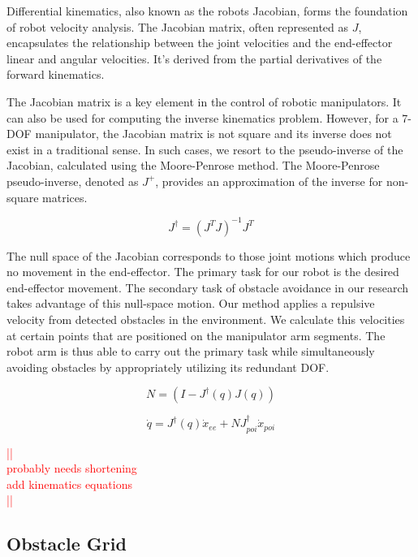 \documentclass[a4paper]{article}
\newcommand\todocomment[1]{\textcolor{red}{||\\ #1\\||}}
\begin{document}
Differential kinematics, also known as the robots Jacobian, forms the foundation of robot velocity analysis. The Jacobian matrix, often represented as $J$, encapsulates the relationship between the joint velocities and the end-effector linear and angular velocities. It's derived from the partial derivatives of the forward kinematics.

The Jacobian matrix is a key element in the control of robotic manipulators. It can also be used for computing the inverse kinematics problem. However, for a 7-DOF manipulator, the Jacobian matrix is not square and its inverse does not exist in a traditional sense. In such cases, we resort to the pseudo-inverse of the Jacobian, calculated using the Moore-Penrose method. The Moore-Penrose pseudo-inverse, denoted as $J^+$, provides an approximation of the inverse for non-square matrices. 

\begin{equation}
	J^{\dagger} = (J^{T}J)^{-1}J^{T}
	\label{eq:moore_penrose}
\end{equation}
    
The null space of the Jacobian corresponds to those joint motions which produce no movement in the end-effector. The primary task for our robot is the desired end-effector movement. The secondary task of obstacle avoidance in our research takes advantage of this null-space motion. Our method applies a repulsive velocity from detected obstacles in the environment. We calculate this velocities at certain points that are positioned on the manipulator arm segments. The robot arm is thus able to carry out the primary task while simultaneously avoiding obstacles by appropriately utilizing its redundant DOF.

\begin{equation}
	N = (I - J^{\dagger}(q)J(q))
	\label{eq:Null-Space}
\end{equation}

\begin{equation}
	\dot{q} = J^{\dagger}(q) \dot{x}_{ee} + N J^{\dagger}_{poi} \dot{x}_{poi}
	\label{eq:manipulator_kinematics}
\end{equation}







\todocomment{probably needs shortening \\
			 add kinematics equations}

\subsection{Obstacle Grid}
\end{document}

